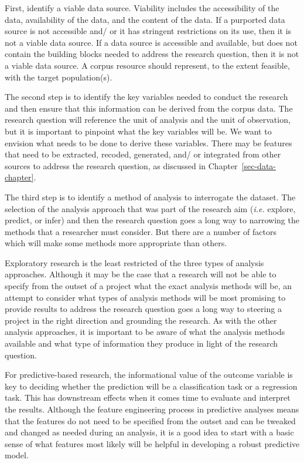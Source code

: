 \documentclass[
  letterpaper,
]{latex/krantz}
\theoremstyle{definition}
\theoremstyle{remark}
\begin{document}
First, identify a viable data source. Viability includes the
accessibility of the data, availability of the data, and the content of
the data. If a purported data source is not accessible and/ or it has
stringent restrictions on its use, then it is not a viable data source.
If a data source is accessible and available, but does not contain the
building blocks needed to address the research question, then it is not
a viable data source. A corpus resource should represent, to the extent
feasible, with the target population(s).

The second step is to identify the key variables needed to conduct the
research and then ensure that this information can be derived from the
corpus data. The research question will reference the unit of analysis
and the unit of observation, but it is important to pinpoint what the
key variables will be. We want to envision what needs to be done to
derive these variables. There may be features that need to be extracted,
recoded, generated, and/ or integrated from other sources to address the
research question, as discussed in Chapter~\ref{sec-data-chapter}.

The third step is to identify a method of analysis to interrogate the
dataset. The selection of the analysis approach that was part of the
research aim (\emph{i.e.} explore, predict, or infer) and then the
research question goes a long way to narrowing the methods that a
researcher must consider. But there are a number of factors which will
make some methods more appropriate than others.

Exploratory research is the least restricted of the three types of
analysis approaches. Although it may be the case that a research will
not be able to specify from the outset of a project what the exact
analysis methods will be, an attempt to consider what types of analysis
methods will be most promising to provide results to address the
research question goes a long way to steering a project in the right
direction and grounding the research. As with the other analysis
approaches, it is important to be aware of what the analysis methods
available and what type of information they produce in light of the
research question.

For predictive-based research, the informational value of the outcome
variable is key to deciding whether the prediction will be a
classification task or a regression task. This has downstream effects
when it comes time to evaluate and interpret the results. Although the
feature engineering process in predictive analyses means that the
features do not need to be specified from the outset and can be tweaked
and changed as needed during an analysis, it is a good idea to start
with a basic sense of what features most likely will be helpful in
developing a robust predictive model.
\end{document}
